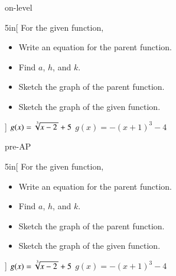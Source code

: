 

\begin{taggedblock}{on-level}
    \begin{my2Problems}{5in}[
        For the given function,
        \vspace{-0.5em}
        \begin{itemize}[nosep]
            \item Write an equation for the parent function.
            \item Find $a$, $h$, and $k$.
            \item Sketch the graph of the parent function.
            \item Sketch the graph of the given function.
        \end{itemize}
        ]
        {
            $g(x) = \myRoot[3]{x-2} + 5$
        }
        {
            $g(x) = -(x+1)^3 - 4$
        }
    \end{my2Problems}
\end{taggedblock}

\begin{taggedblock}{pre-AP}
    \begin{my2Problems}{5in}[
        For the given function,
        \vspace{-0.5em}
        \begin{itemize}[nosep]
            \item Write an equation for the parent function.
            \item Find $a$, $h$, and $k$.
            \item Sketch the graph of the parent function.
            \item Sketch the graph of the given function.
        \end{itemize}
        ]
        {
            $g(x) = \myRoot[3]{x-2} + 5$
        }
        {
            $g(x) = -(x+1)^3 - 4$
        }
    \end{my2Problems}
\end{taggedblock}
